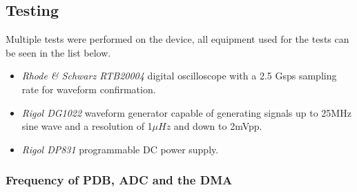 \clearpage

\subsection{Testing}









Multiple tests were performed on the device, all equipment used for the tests can be seen in the list below.
\begin{itemize}
    \item \textit{Rhode \& Schwarz RTB20004} digital oscilloscope with a 2.5 Gsps sampling rate for waveform confirmation.
    \item \textit{Rigol DG1022} waveform generator capable of generating signals up to 25MHz sine wave and a resolution of 1$\mu Hz$ and down to 2mVpp.
    \item \textit{Rigol DP831} programmable DC power supply.
\end{itemize}



\subsubsection{Frequency of PDB, ADC and the DMA}

